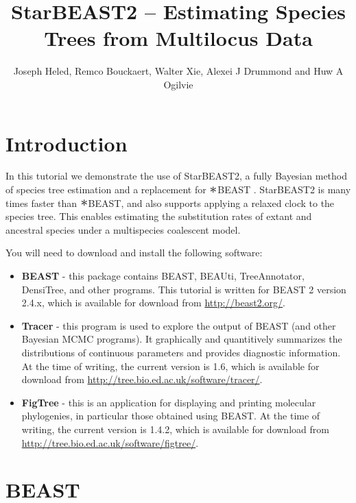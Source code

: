 \documentclass{article}
\newcommand{\BEASTVersion}{2.4.x}
\newcommand{\TracerVersion}{1.6}
\newcommand{\FigTreeVersion}{1.4.2}
\newcommand{\Conv}{\mathop{\scalebox{1.5}{$\ast$}}}
\begin{document}
\title{StarBEAST2 -- Estimating Species Trees from Multilocus Data}

\author{Joseph Heled, Remco Bouckaert, Walter Xie, Alexei J Drummond and Huw A Ogilvie}

\maketitle

\section{Introduction}

In this tutorial we demonstrate the use of StarBEAST2, a fully Bayesian method
of species tree estimation and a replacement for $\Conv$BEAST
\citep{Heled01032010}. StarBEAST2 is many times faster than $\Conv$BEAST,
and also supports applying a relaxed clock to the species tree. This enables
estimating the substitution rates of extant and ancestral species under a
multispecies coalescent model.

You will need to download and install the following software:

\begin{itemize}
\item \textbf{BEAST} - this package contains BEAST, BEAUti,
TreeAnnotator, DensiTree, and other programs. This tutorial is written
for BEAST 2 \citep{10.1371/journal.pcbi.1003537} version {\BEASTVersion}, which is available for download from
\url{http://beast2.org/}.
\item \textbf{Tracer} - this program is used to explore the output of BEAST (and
other Bayesian MCMC programs). It graphically and quantitively summarizes the
distributions of continuous parameters and provides diagnostic information. At
the time of writing, the current version is {\TracerVersion}, which is available
for download from \url{http://tree.bio.ed.ac.uk/software/tracer/}.
\item \textbf{FigTree} - this is an application for displaying and printing
molecular phylogenies, in particular those obtained using BEAST. At the time of
writing, the current version is {\FigTreeVersion}, which is available for download
from \url{http://tree.bio.ed.ac.uk/software/figtree/}.
\end{itemize}

\section{BEAST}
\end{document}
